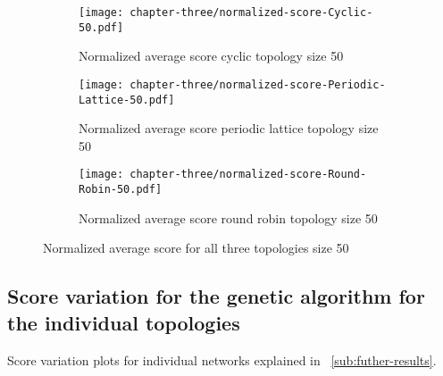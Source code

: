 \begin{figure}[H]
	\centering
	\begin{subfigure}[t]{0.65\textwidth}
		\centering
		\texttt{[image: chapter-three/normalized-score-Cyclic-50.pdf]}
		\caption{Normalized average score cyclic topology size 50}
	\end{subfigure}
	\hfill
	\begin{subfigure}[t]{0.65\textwidth}\centering
		\centering
		\texttt{[image: chapter-three/normalized-score-Periodic-Lattice-50.pdf]}
		\caption{Normalized average score periodic lattice topology size 50}
	\end{subfigure}
	\hfill
	\begin{subfigure}[t]{0.65\textwidth}\centering
		\centering
		\texttt{[image: chapter-three/normalized-score-Round-Robin-50.pdf]}
		\caption{Normalized average score round robin topology size 50}
	\end{subfigure}
	\caption{Normalized average score for all three topologies size 50}
	\label{fig:average-score-fifty}
\end{figure}

\subsection{Score variation for the genetic algorithm for the individual topologies}
\label{append:genetic-variation}
Score variation plots for individual networks explained in ~\autoref{sub:futher-results}.


